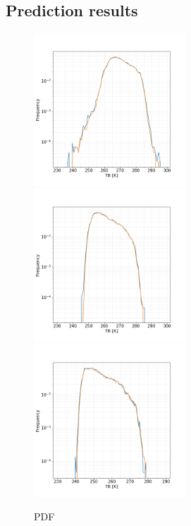 \documentclass[amt, manuscript]{copernicus}
\begin{document}
\subsection{Prediction results}
%
\begin{figure}[t]
	\includegraphics[height=57mm]{Figures/PDF_I1V_single.png} 
	\includegraphics[height=57mm]{Figures/PDF_I2V_single.png}
	\includegraphics[height=57mm]{Figures/PDF_I3V_single.png} 
	\caption{PDF}
	\label{fig:PDF_predictions}	
\end{figure}
\end{document}
